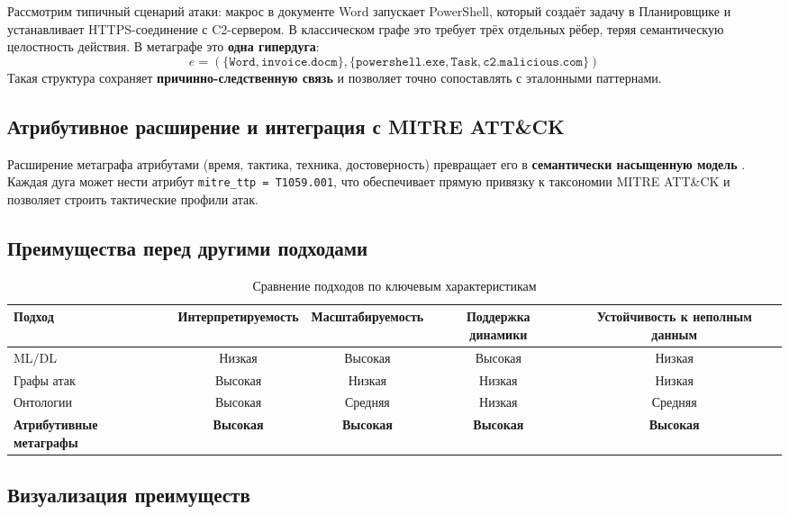 Рассмотрим типичный сценарий атаки: макрос в документе Word запускает PowerShell, который создаёт задачу в Планировщике и устанавливает HTTPS-соединение с C2-сервером. В классическом графе это требует трёх отдельных рёбер, теряя семантическую целостность действия. В метаграфе это \textbf{одна гипердуга}:
\[
e = (\{ \texttt{Word}, \texttt{invoice.docm} \}, \{ \texttt{powershell.exe}, \texttt{Task}, \texttt{c2.malicious.com} \})
\]
Такая структура сохраняет \textbf{причинно-следственную связь} и позволяет точно сопоставлять с эталонными паттернами.

\subsection{Атрибутивное расширение и интеграция с MITRE ATT\&CK}

Расширение метаграфа атрибутами (время, тактика, техника, достоверность) превращает его в \textbf{семантически насыщенную модель} \cite{Latypov2020}. Каждая дуга может нести атрибут \texttt{mitre\_ttp = T1059.001}, что обеспечивает прямую привязку к таксономии MITRE ATT\&CK и позволяет строить тактические профили атак.

\subsection{Преимущества перед другими подходами}

\begin{table}[h]
\centering
\caption{Сравнение подходов по ключевым характеристикам}
\label{tab:model_comparison}
\begin{tabular}{lcccc}
\toprule
Подход & Интерпретируемость & Масштабируемость & Поддержка динамики & Устойчивость к неполным данным \\
\midrule
ML/DL  & Низкая             & Высокая          & Высокая             & Низкая                        \\
Графы атак & Высокая        & Низкая           & Низкая              & Низкая                        \\
Онтологии & Высокая          & Средняя          & Низкая              & Средняя                       \\
\textbf{Атрибутивные метаграфы} & \textbf{Высокая} & \textbf{Высокая} & \textbf{Высокая} & \textbf{Высокая} \\
\bottomrule
\end{tabular}
\end{table}

\subsection{Визуализация преимуществ}

